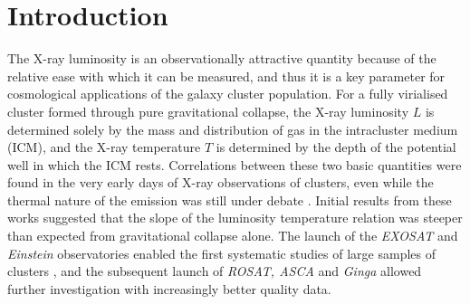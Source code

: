 \documentclass[oldversion]{aa}
\begin{document}
   \maketitle
%

\section{Introduction}

The X-ray luminosity is an observationally attractive quantity because
of the relative ease with which it can be measured, and thus it is a key parameter for cosmological applications of the galaxy cluster population. 
For a fully virialised cluster formed through pure
gravitational collapse, the X-ray luminosity $L$ is determined
solely by the mass and distribution of gas in the intracluster medium (ICM), and the
X-ray temperature $T$ is determined by the depth of the potential well
in which the ICM rests. Correlations between these two basic
quantities were found in the very early days of X-ray observations of
clusters, even while the thermal nature of the emission was still under
debate \citep{mitchell77,mushotzky78,ht79}. Initial results from these works suggested that the slope of the luminosity temperature relation was steeper than expected from gravitational collapse alone. The launch of the {\it
  EXOSAT} and {\it Einstein} observatories enabled the first
systematic studies of large samples of clusters
\citep{es91,david93}, and the subsequent launch of {\it ROSAT, ASCA} and
{\it Ginga} allowed further investigation with increasingly better
quality data. 
\end{document}
